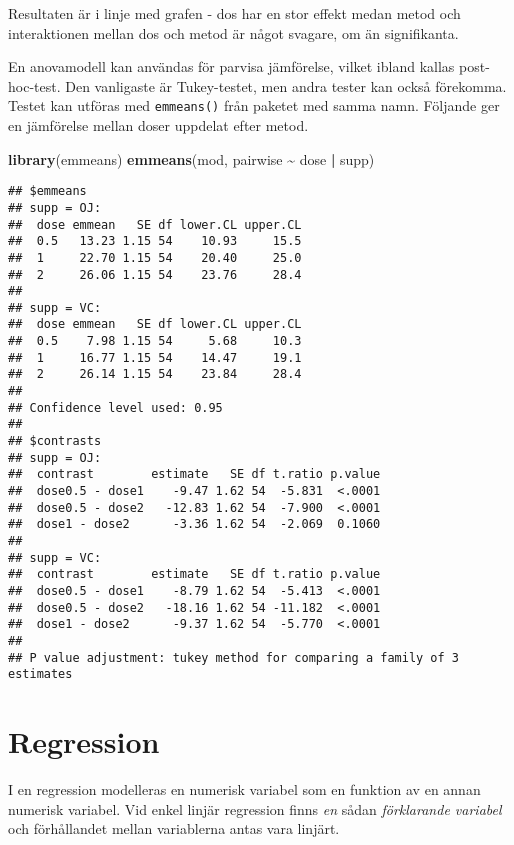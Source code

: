 \documentclass[
]{book}
\newenvironment{Shaded}{\begin{snugshade}}{\end{snugshade}}
\newcommand{\FunctionTok}[1]{\textcolor[rgb]{0.13,0.29,0.53}{\textbf{#1}}}
\newcommand{\NormalTok}[1]{#1}
\newcommand{\SpecialCharTok}[1]{\textcolor[rgb]{0.81,0.36,0.00}{\textbf{#1}}}
\theoremstyle{definition}
\theoremstyle{definition}
\theoremstyle{definition}
\theoremstyle{definition}
\theoremstyle{remark}
\begin{document}
Resultaten är i linje med grafen - dos har en stor effekt medan metod och interaktionen mellan dos och metod är något svagare, om än signifikanta.

En anovamodell kan användas för parvisa jämförelse, vilket ibland kallas post-hoc-test. Den vanligaste är Tukey-testet, men andra tester kan också förekomma. Testet kan utföras med \texttt{emmeans()} från paketet med samma namn. Följande ger en jämförelse mellan doser uppdelat efter metod.

\begin{Shaded}
\begin{Highlighting}[]
\FunctionTok{library}\NormalTok{(emmeans)}
\FunctionTok{emmeans}\NormalTok{(mod, pairwise }\SpecialCharTok{\textasciitilde{}}\NormalTok{ dose }\SpecialCharTok{|}\NormalTok{ supp)}
\end{Highlighting}
\end{Shaded}

\begin{verbatim}
## $emmeans
## supp = OJ:
##  dose emmean   SE df lower.CL upper.CL
##  0.5   13.23 1.15 54    10.93     15.5
##  1     22.70 1.15 54    20.40     25.0
##  2     26.06 1.15 54    23.76     28.4
## 
## supp = VC:
##  dose emmean   SE df lower.CL upper.CL
##  0.5    7.98 1.15 54     5.68     10.3
##  1     16.77 1.15 54    14.47     19.1
##  2     26.14 1.15 54    23.84     28.4
## 
## Confidence level used: 0.95 
## 
## $contrasts
## supp = OJ:
##  contrast        estimate   SE df t.ratio p.value
##  dose0.5 - dose1    -9.47 1.62 54  -5.831  <.0001
##  dose0.5 - dose2   -12.83 1.62 54  -7.900  <.0001
##  dose1 - dose2      -3.36 1.62 54  -2.069  0.1060
## 
## supp = VC:
##  contrast        estimate   SE df t.ratio p.value
##  dose0.5 - dose1    -8.79 1.62 54  -5.413  <.0001
##  dose0.5 - dose2   -18.16 1.62 54 -11.182  <.0001
##  dose1 - dose2      -9.37 1.62 54  -5.770  <.0001
## 
## P value adjustment: tukey method for comparing a family of 3 estimates
\end{verbatim}

\hypertarget{regression}{%
\section{Regression}\label{regression}}

I en regression modelleras en numerisk variabel som en funktion av en annan numerisk variabel. Vid enkel linjär regression finns \emph{en} sådan \emph{förklarande variabel} och förhållandet mellan variablerna antas vara linjärt.
\end{document}
